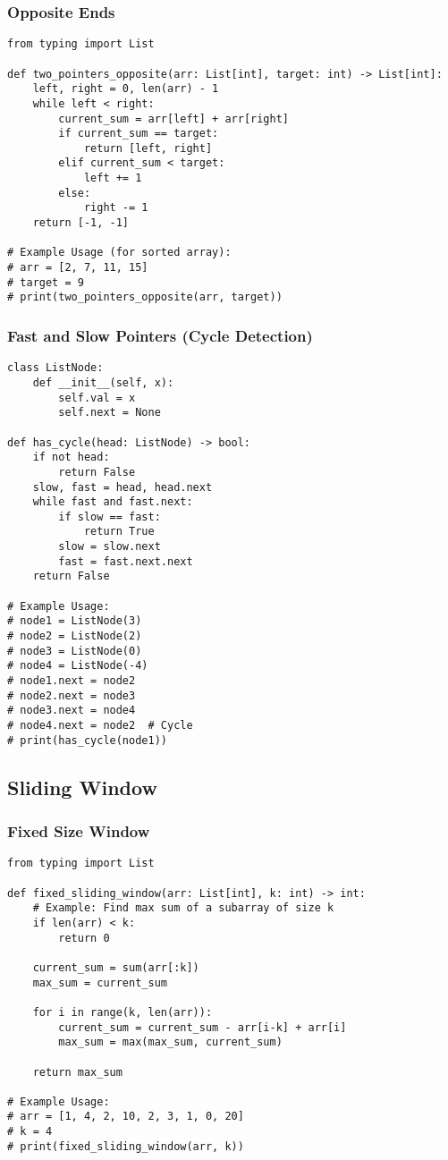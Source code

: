 \documentclass[11pt, a4paper]{article}
\begin{document}
\subsubsection{Opposite Ends}
\begin{verbatim}
from typing import List

def two_pointers_opposite(arr: List[int], target: int) -> List[int]:
    left, right = 0, len(arr) - 1
    while left < right:
        current_sum = arr[left] + arr[right]
        if current_sum == target:
            return [left, right]
        elif current_sum < target:
            left += 1
        else:
            right -= 1
    return [-1, -1]

# Example Usage (for sorted array):
# arr = [2, 7, 11, 15]
# target = 9
# print(two_pointers_opposite(arr, target))
\end{verbatim}

\subsubsection{Fast and Slow Pointers (Cycle Detection)}
\begin{verbatim}
class ListNode:
    def __init__(self, x):
        self.val = x
        self.next = None

def has_cycle(head: ListNode) -> bool:
    if not head:
        return False
    slow, fast = head, head.next
    while fast and fast.next:
        if slow == fast:
            return True
        slow = slow.next
        fast = fast.next.next
    return False

# Example Usage:
# node1 = ListNode(3)
# node2 = ListNode(2)
# node3 = ListNode(0)
# node4 = ListNode(-4)
# node1.next = node2
# node2.next = node3
# node3.next = node4
# node4.next = node2  # Cycle
# print(has_cycle(node1))
\end{verbatim}

\subsection{Sliding Window}
\subsubsection{Fixed Size Window}
\begin{verbatim}
from typing import List

def fixed_sliding_window(arr: List[int], k: int) -> int:
    # Example: Find max sum of a subarray of size k
    if len(arr) < k:
        return 0
    
    current_sum = sum(arr[:k])
    max_sum = current_sum
    
    for i in range(k, len(arr)):
        current_sum = current_sum - arr[i-k] + arr[i]
        max_sum = max(max_sum, current_sum)
        
    return max_sum

# Example Usage:
# arr = [1, 4, 2, 10, 2, 3, 1, 0, 20]
# k = 4
# print(fixed_sliding_window(arr, k))
\end{verbatim}
\end{document}
